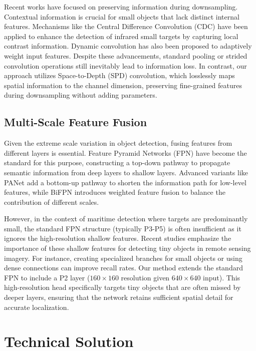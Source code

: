\documentclass[lettersize,journal]{IEEEtran}
\begin{document}
Recent works have focused on preserving information during downsampling. Contextual information is crucial for small objects that lack distinct internal features. Mechanisms like the Central Difference Convolution (CDC) \cite{b3} have been applied to enhance the detection of infrared small targets by capturing local contrast information. Dynamic convolution \cite{ref20} has also been proposed to adaptively weight input features. Despite these advancements, standard pooling or strided convolution operations still inevitably lead to information loss. In contrast, our approach utilizes Space-to-Depth (SPD) convolution, which losslessly maps spatial information to the channel dimension, preserving fine-grained features during downsampling without adding parameters.

\subsection{Multi-Scale Feature Fusion}
Given the extreme scale variation in object detection, fusing features from different layers is essential. Feature Pyramid Networks (FPN) \cite{ref_fpn} have become the standard for this purpose, constructing a top-down pathway to propagate semantic information from deep layers to shallow layers. Advanced variants like PANet \cite{ref_panet} add a bottom-up pathway to shorten the information path for low-level features, while BiFPN \cite{ref23} introduces weighted feature fusion to balance the contribution of different scales.

However, in the context of maritime detection where targets are predominantly small, the standard FPN structure (typically P3-P5) is often insufficient as it ignores the high-resolution shallow features. Recent studies \cite{b4} emphasize the importance of these shallow features for detecting tiny objects in remote sensing imagery. For instance, creating specialized branches for small objects or using dense connections can improve recall rates. Our method extends the standard FPN to include a P2 layer ($160 \times 160$ resolution given $640 \times 640$ input). This high-resolution head specifically targets tiny objects that are often missed by deeper layers, ensuring that the network retains sufficient spatial detail for accurate localization.

\section{Technical Solution}
\label{sec:method}
\end{document}
